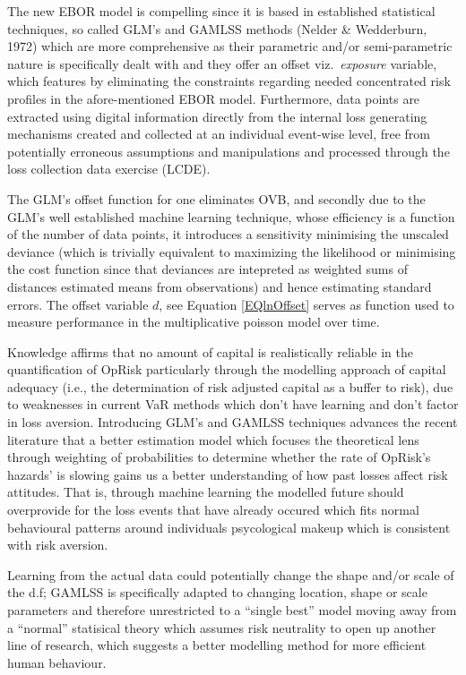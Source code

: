 \documentclass{DissertateUSU}
\begin{document}
The new EBOR model is compelling since it is based in established
statistical techniques, so called GLM's and GAMLSS methods (Nelder \&
Wedderburn, 1972) which are more comprehensive as their parametric
and/or semi-parametric nature is specifically dealt with and they offer
an offset viz.~\emph{exposure} variable, which features by eliminating
the constraints regarding needed concentrated risk profiles in the
afore-mentioned EBOR model. Furthermore, data points are extracted using
digital information directly from the internal loss generating
mechanisms created and collected at an individual event-wise level, free
from potentially erroneous assumptions and manipulations and processed
through the loss collection data exercise (LCDE). \medskip

The GLM's offset function for one eliminates OVB, and secondly due to
the GLM's well established machine learning technique, whose efficiency
is a function of the number of data points, it introduces a sensitivity
minimising the unscaled deviance (which is trivially equivalent to
maximizing the likelihood or minimising the cost function since that
deviances are intepreted as weighted sums of distances estimated means
from observations) and hence estimating standard errors. The offset
variable \(d\), see Equation \ref{EQlnOffset} serves as function used to
measure performance in the multiplicative poisson model over
time.\medskip    

Knowledge affirms that no amount of capital is realistically reliable in
the quantification of OpRisk particularly through the modelling approach
of capital adequacy (i.e., the determination of risk adjusted capital as
a buffer to risk), due to weaknesses in current VaR methods which don't
have learning and don't factor in loss aversion. Introducing GLM's and
GAMLSS techniques advances the recent literature that a better
estimation model which focuses the theoretical lens through weighting of
probabilities to determine whether the rate of OpRisk's hazards' is
slowing gains us a better understanding of how past losses affect risk
attitudes. That is, through machine learning the modelled future should
overprovide for the loss events that have already occured which fits
normal behavioural patterns around individuals psycological makeup which
is consistent with risk aversion.\medskip

Learning from the actual data could potentially change the shape and/or
scale of the d.f; GAMLSS is specifically adapted to changing location,
shape or scale parameters and therefore unrestricted to a ``single
best'' model moving away from a ``normal'' statisical theory which
assumes risk neutrality to open up another line of research, which
suggests a better modelling method for more efficient human behaviour.
\end{document}
